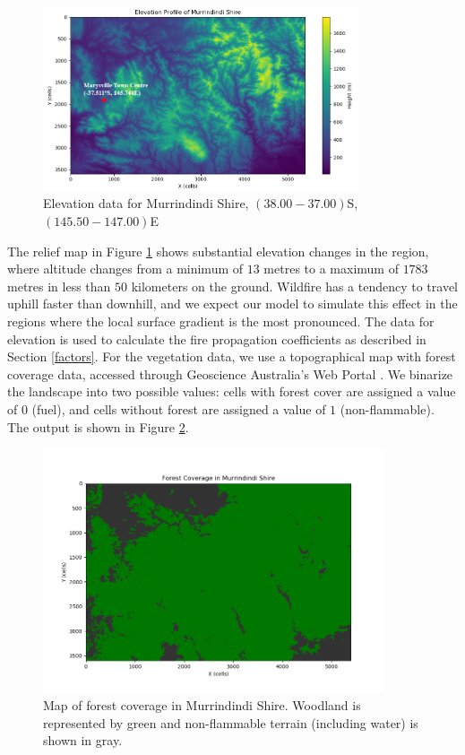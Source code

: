 \begin{figure}[h!]
\centering
\includegraphics[width=0.83\textwidth]{Figures/elevation.png}\caption{Elevation data for Murrindindi Shire, $(38.00 -37.00)$\degree S, $(145.50 - 147.00)$\degree E}\label{topography}
\end{figure}

The relief map in Figure \ref{topography} shows substantial elevation changes in the region, where altitude changes from a minimum of $13$ metres to a maximum of $1783$ metres in less than $50$ kilometers on the ground. Wildfire has a tendency to travel uphill faster than downhill, and we expect our model to simulate this effect in the regions where the local surface gradient is the most pronounced. The data for elevation is used to calculate the fire propagation coefficients as described in Section \ref{factors}.\newline
\indent For the vegetation data, we use a topographical map with forest coverage data, accessed through Geoscience Australia's Web Portal \cite{Geodata}. We binarize the landscape into two possible values: cells with forest cover are assigned a value of $0$ (fuel), and cells without forest are assigned a value of $1$ (non-flammable). The output is shown in Figure \ref{forestcover}.

\begin{figure}[h!]
\centering
\includegraphics[width=0.9\textwidth]{Figures/ForestCover.png}\caption{Map of forest coverage in Murrindindi Shire. Woodland is represented by green and non-flammable terrain (including water) is shown in gray.}\label{forestcover}
\end{figure}


